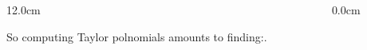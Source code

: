 \begin{frame}
\begin{columns}
\begin{column}{12.0cm}
\vspace{0.2cm}

So computing Taylor polnomials amounts to finding:\quad {}\quad. \\

\vspace{2.2cm}

\end{column}
\begin{column}{0.0cm}\end{column}
\end{columns}
\end{frame}

%
%
%
%
%
%
%
